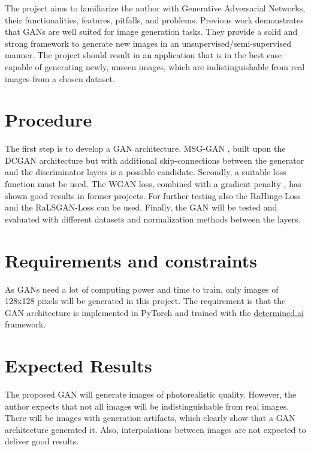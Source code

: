 \documentclass[]{article}
\begin{document}
\noindent
The project aims to familiarize the author with Generative Adversarial Networks, their functionalities, features, pitfalls, and problems. Previous work demonstrates that GANs are well suited for image generation tasks. They provide a solid and strong framework to generate new images in an unsupervised/semi-supervised manner. The project should result in an application that is in the best case capable of generating newly, unseen images, which are indistinguishable from real images from a chosen dataset.

\section{Procedure}

\noindent
The first step is to develop a GAN architecture. MSG-GAN \cite{karnewar2020msggan}, built upon the DCGAN \cite{radford2016unsupervised} architecture but with additional skip-connections between the generator and the discriminator layers is a possible candidate. Secondly, a suitable loss function must be used. The WGAN loss, combined \cite{arjovsky2017wasserstein} with a gradient penalty \cite{gulrajani2017improved}, has shown good results in former projects. For further testing also the RaHinge-Loss and the RaLSGAN-Loss \cite{jolicoeurmartineau2018relativistic} can be used. Finally, the GAN will be tested and evaluated with different datasets and normalization methods between the layers.

\section{Requirements and constraints}

\noindent
As GANs need a lot of computing power and time to train, only images of 128x128 pixels will be generated in this project. The requirement is that the GAN architecture is implemented in PyTorch \cite{paszke2019pytorch} and trained with the \url{determined.ai} framework.

\section{Expected Results}

\noindent
The proposed GAN will generate images of photorealistic quality. However, the author expects that not all images will be indistinguishable from real images. There will be images with generation artifacts, which clearly show that a GAN architecture generated it. Also, interpolations between images are not expected to deliver good results.
\end{document}
